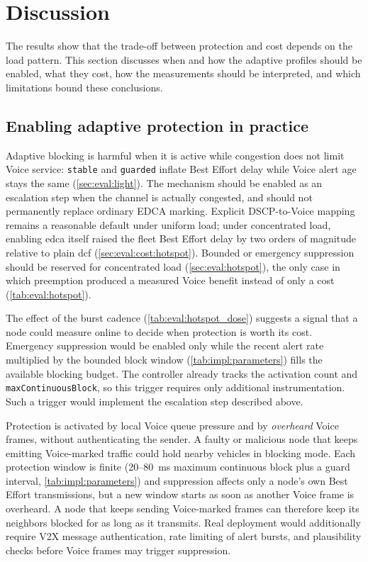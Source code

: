 \section{Discussion}
\label{sec:eval:discussion}

The results show that the trade-off between protection and cost depends on the load pattern. This section discusses when and how the adaptive profiles should be enabled, what they cost, how the measurements should be interpreted, and which limitations bound these conclusions.

\subsection{Enabling adaptive protection in practice}
\label{sec:eval:disc:escalation}

Adaptive blocking is harmful when it is active while congestion does not limit Voice service: \texttt{stable} and \texttt{guarded} inflate Best Effort delay while Voice alert age stays the same (\autoref{sec:eval:light}).
The mechanism should be enabled as an escalation step when the channel is actually congested, and should not permanently replace ordinary EDCA marking.
Explicit DSCP-to-Voice mapping remains a reasonable default under uniform load; under concentrated load, enabling \gls{edca} itself raised the fleet Best Effort delay by two orders of magnitude relative to plain \gls{dcf} (\autoref{sec:eval:cost:hotspot}).
Bounded or emergency suppression should be reserved for concentrated load (\autoref{sec:eval:hotspot}), the only case in which preemption produced a measured Voice benefit instead of only a cost (\autoref{tab:eval:hotspot}).

\label{sec:eval:disc:trigger}
The effect of the burst cadence (\autoref{tab:eval:hotspot_dose}) suggests a signal that a node could measure online to decide when protection is worth its cost.
Emergency suppression would be enabled only while the recent alert rate multiplied by the bounded block window (\autoref{tab:impl:parameters}) fills the available blocking budget.
The controller already tracks the activation count and \texttt{maxContinuousBlock}, so this trigger requires only additional instrumentation.
Such a trigger would implement the escalation step described above.

\label{sec:eval:disc:dos}
Protection is activated by local Voice queue pressure and by \emph{overheard} Voice frames, without authenticating the sender.
A faulty or malicious node that keeps emitting Voice-marked traffic could hold nearby vehicles in blocking mode.
Each protection window is finite (20--80~ms maximum continuous block plus a guard interval, \autoref{tab:impl:parameters}) and suppression affects only a node's own Best Effort transmissions, but a new window starts as soon as another Voice frame is overheard.
A node that keeps sending Voice-marked frames can therefore keep its neighbors blocked for as long as it transmits.
Real deployment would additionally require V2X message authentication, rate limiting of alert bursts, and plausibility checks before Voice frames may trigger suppression.

